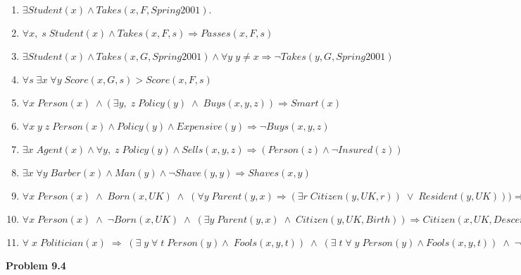 \documentclass[11pt]{article}
\begin{document}
\begin{enumerate}[label=(\alph*)]
\item $\exists Student(x) \wedge Takes(x, F, Spring2001).$
\item $\forall x, \; s \;Student(x) \wedge Takes(x, F, s) \Rightarrow Passes(x, F, s)$
\item $\exists Student(x) \wedge Takes(x, G, Spring2001) \wedge \forall y \; y \neq x \Rightarrow \neg Takes(y, G, Spring2001)$
\item $\forall s\; \exists x\; \forall y\;  Score(x, G, s) > Score(x, F, s)$
\item $\forall x \; Person(x) \; \wedge (\exists y, \; z \; Policy(y) \; \wedge \; Buys(x, y, z)) \Rightarrow Smart(x)$
\item $\forall x \; y \; z \; Person(x) \wedge Policy(y) \wedge Expensive(y) \Rightarrow \neg Buys(x, y, z)$
\item $\exists x \; Agent(x) \wedge \forall y, \; z \; Policy(y) \wedge Sells (x, y, z) \Rightarrow (Person(z) \wedge \neg Insured(z))$
\item $\exists x \; \forall y \; Barber(x) \wedge Man(y) \wedge \neg Shave(y, y) \Rightarrow Shaves(x, y)$
\item $\forall x \; Person(x) \; \wedge \; Born(x, UK) \; \wedge \; (\forall y \; Parent(y, x) \Rightarrow (\exists r \; Citizen(y, UK, r)) \; \vee
\; Resident(y, UK))) \Rightarrow Citizen(x, UK, Birth)$
\item $\forall x \; Person(x) \; \wedge \; \neg Born(x, UK) \; \wedge \; (\exists y \; Parent(y, x) \; \wedge \; Citizen(y, UK, Birth))
\Rightarrow Citizen(x, UK, Descent)$
\item $\forall \; x \; Politician(x) \; \Rightarrow \; (\exists \; y \; \forall \; t \; Person(y) \wedge \; Fools(x, y, t)) \;
\wedge \; (\exists \; t \; \forall \; y \; Person(y) \wedge Fools(x, y, t)) \; \wedge \;
\neg(\forall \; t \; \forall \; y \; Person(y) \wedge \; Fools(x, y, t)) $
\end{enumerate}
\textbf{Problem 9.4}
\end{document}
